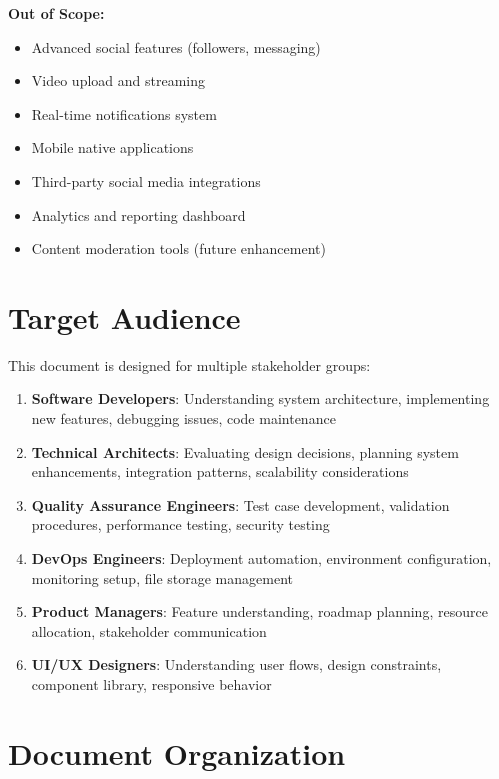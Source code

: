 \documentclass[12pt,a4paper]{report}
\begin{document}
\textbf{Out of Scope:}
\begin{itemize}
    \item Advanced social features (followers, messaging)
    \item Video upload and streaming
    \item Real-time notifications system
    \item Mobile native applications
    \item Third-party social media integrations
    \item Analytics and reporting dashboard
    \item Content moderation tools (future enhancement)
\end{itemize}

\section{Target Audience}

This document is designed for multiple stakeholder groups:

\begin{enumerate}
    \item \textbf{Software Developers}: Understanding system architecture, implementing new features, debugging issues, code maintenance
    
    \item \textbf{Technical Architects}: Evaluating design decisions, planning system enhancements, integration patterns, scalability considerations
    
    \item \textbf{Quality Assurance Engineers}: Test case development, validation procedures, performance testing, security testing
    
    \item \textbf{DevOps Engineers}: Deployment automation, environment configuration, monitoring setup, file storage management
    
    \item \textbf{Product Managers}: Feature understanding, roadmap planning, resource allocation, stakeholder communication
    
    \item \textbf{UI/UX Designers}: Understanding user flows, design constraints, component library, responsive behavior
\end{enumerate}

\section{Document Organization}
\end{document}
